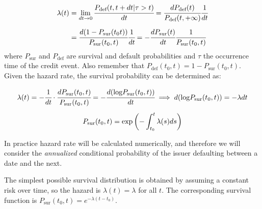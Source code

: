 \begin{equation}
\begin{split}
\lambda(t)& = \lim_{dt\rightarrow 0} \cfrac{P_{\textrm{def}}(t, t+dt|\tau> t)}{dt} = \cfrac{dP_{\textrm{def}}(t)}{P_{\textrm{def}}(t, +\infty)}\cfrac{1}{dt}\\[5 pt] &
= \cfrac{d(1-P_{\textrm{sur}}(t_0 t))}{P_{\textrm{sur}}(t_0, t)}\cfrac{1}{dt} = -\cfrac{dP_{\textrm{sur}}(t)}{dt}\cfrac{1}{P_{\textrm{sur}}(t_0, t)}
\end{split}
\end{equation}
where $P_{\textrm{sur}}$ and $P_{\textrm{def}}$ are survival and default probabilities and $\tau$ the occurrence time of the credit event.
Also remember that $P_{\textrm{def}}(t_0, t) = 1 - P_{\textrm{sur}}(t_0, t)$. Given the hazard rate, the survival probability can be determined as:


\begin{equation}
\begin{gathered}
\lambda(t) = -\cfrac{1}{dt}\cdot\cfrac{dP_{\textrm{sur}}(t_0, t)}{P_{\textrm{sur}}(t_0, t)} = -\cfrac{d(\textrm{log}P_{\textrm{sur}}(t_0, t))}{dt} \implies d(\textrm{log}P_{\textrm{sur}}(t_0, t)) = -\lambda dt\\[5pt]
P_{\textrm{sur}}(t_0, t) = \mathrm{exp}\left(-\int_{t_0}^{t}\lambda(s) ds\right)
\end{gathered}
\label{eq:constant_hazard_rate_prob}
\end{equation}

In practice hazard rate will be calculated numerically, and therefore we will consider the \emph{annualized} conditional probability of the issuer defaulting between a date and the next.

\label{sec:constant_hazard_rate}
The simplest possible survival distribution is obtained by assuming a constant risk over time, so the hazard is $\lambda (t)=\lambda$ for all $t$. The corresponding survival function is $P_{\textrm{sur}}(t_0, t) = e^{-\lambda (t-t_0)}$.

